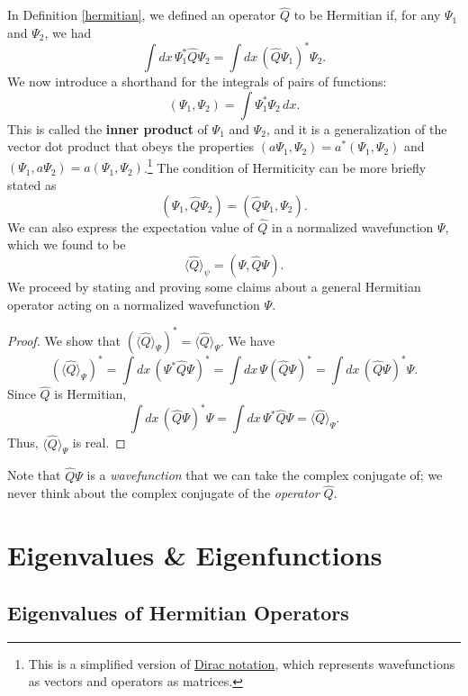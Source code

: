 In Definition \ref{hermitian}, we defined an operator $\hat{Q}$ to be Hermitian if, for any $\Psi_1$ and $\Psi_2$, we had $$\int dx\,\Psi_1^*\hat{Q}\Psi_2 = \int dx\,(\hat{Q}\Psi_1)^*\Psi_2.$$We now introduce a shorthand for the integrals of pairs of functions: $$(\Psi_1,\Psi_2)=\int \Psi_1^*\Psi_2\,dx.$$This is called the \textbf{inner product} of $\Psi_1$ and $\Psi_2$, and it is a generalization of the vector dot product that obeys the properties $(a\Psi_1,\Psi_2)=a^*(\Psi_1,\Psi_2)$ and $(\Psi_1,a\Psi_2)=a(\Psi_1,\Psi_2)$.\footnote{This is a simplified version of \href{https:\/\/en.wikipedia.org\/wiki\/Bra\%E2\%80\%93ket\_notation}{Dirac notation}, 
which represents wavefunctions as vectors and operators as matrices.} The condition of Hermiticity can be more briefly stated as$$(\Psi_1,\hat{Q}\Psi_2)=(\hat{Q}\Psi_1,\Psi_2).$$We can also express the expectation value of $\hat{Q}$ in a normalized wavefunction $\Psi$, which we found to be $$\langle\hat{Q}\rangle_\psi=(\Psi,\hat{Q}\Psi).$$We proceed by stating and proving some claims about a general Hermitian operator acting on a normalized wavefunction $\Psi$.

\begin{framedprop}\label{9.1.1}

\begin{proof}
    We show that $(\langle\hat{Q}\rangle_\Psi)^*=\langle\hat{Q}\rangle_\Psi$. We have $$(\langle\hat{Q}\rangle_\Psi)^*=\int dx\,(\Psi^*\hat{Q}\Psi)^*=\int dx\,\Psi(\hat{Q}\Psi)^*=\int dx\,(\hat{Q}\Psi)^*\Psi.$$ Since $\hat{Q}$ is Hermitian, $$\int dx\,(\hat{Q}\Psi)^*\Psi=\int dx\,\Psi^*\hat{Q}\Psi=\langle\hat{Q}\rangle_\Psi.$$Thus, $\langle\hat{Q}\rangle_\Psi$ is real.
\end{proof}
\end{framedprop}

Note that $\hat{Q}\Psi$ is a \textit{wavefunction} that we can take the complex conjugate of; we never think about the complex conjugate of the \textit{operator} $\hat{Q}$.

\section{Eigenvalues \& Eigenfunctions}

\subsection{Eigenvalues of Hermitian Operators}\label{eigenvalues}

